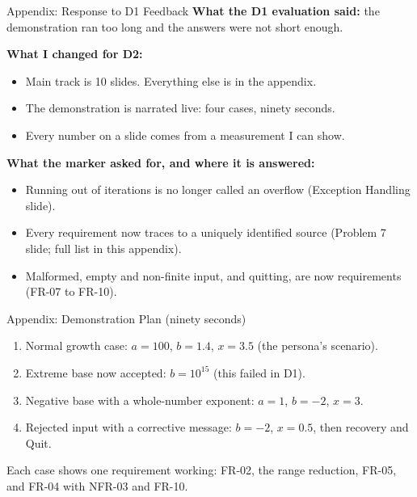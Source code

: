 \documentclass[11pt]{beamer}
\newcommand{\backupbegin}{%
  \newcounter{finalframe}\setcounter{finalframe}{\value{framenumber}}}
\begin{document}
\appendix
\backupbegin

\begin{frame}{Appendix: Response to D1 Feedback}
  \textbf{What the D1 evaluation said:} the demonstration ran too long and
  the answers were not short enough.
  \medskip

  \textbf{What I changed for D2:}
  \begin{itemize}
    \item Main track is 10 slides. Everything else is in the appendix.
    \item The demonstration is narrated live: four cases, ninety seconds.
    \item Every number on a slide comes from a measurement I can show.
  \end{itemize}
  \medskip

  \textbf{What the marker asked for, and where it is answered:}
  \begin{itemize}
    \item Running out of iterations is no longer called an overflow
          (Exception Handling slide).
    \item Every requirement now traces to a uniquely identified source
          (Problem 7 slide; full list in this appendix).
    \item Malformed, empty and non-finite input, and quitting, are now
          requirements (FR-07 to FR-10).
  \end{itemize}
\end{frame}

\begin{frame}{Appendix: Demonstration Plan (ninety seconds)}
  \begin{enumerate}
    \item Normal growth case: $a = 100$, $b = 1.4$, $x = 3.5$ (the persona's
          scenario).
    \item Extreme base now accepted: $b = 10^{15}$ (this failed in D1).
    \item Negative base with a whole-number exponent: $a = 1$, $b = -2$, $x = 3$.
    \item Rejected input with a corrective message: $b = -2$, $x = 0.5$, then
          recovery and Quit.
  \end{enumerate}
  \medskip
  Each case shows one requirement working: FR-02, the range reduction,
  FR-05, and FR-04 with NFR-03 and FR-10.
\end{frame}
\end{document}
